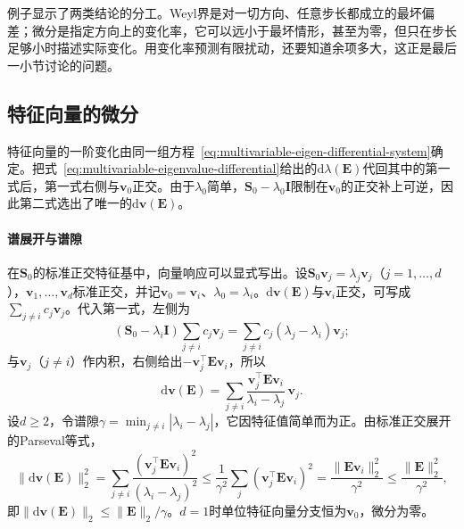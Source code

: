 例子显示了两类结论的分工。Weyl界是对一切方向、任意步长都成立的最坏偏差；微分是指定方向上的变化率，它可以远小于最坏情形，甚至为零，但只在步长足够小时描述实际变化。用变化率预测有限扰动，还要知道余项多大，这正是最后一小节讨论的问题。

\subsection{特征向量的微分}
\label{sec:multivariable-eigenvector-differential}

特征向量的一阶变化由同一组方程~\eqref{eq:multivariable-eigen-differential-system}确定。把式~\eqref{eq:multivariable-eigenvalue-differential}给出的$\mathrm d\lambda(\bm E)$代回其中的第一式后，第一式右侧与$\bm v_0$正交。由于$\lambda_0$简单，$\bm S_0-\lambda_0\bm I$限制在$\bm v_0$的正交补上可逆，因此第二式选出了唯一的$\mathrm d\bm v(\bm E)$。

\paragraph{谱展开与谱隙}
在$\bm S_0$的标准正交特征基中，向量响应可以显式写出。设$\bm S_0\bm v_j=\lambda_j\bm v_j$（$j=1,\ldots,d$），$\bm v_1,\ldots,\bm v_d$标准正交，并记$\bm v_0=\bm v_i$、$\lambda_0=\lambda_i$。$\mathrm d\bm v(\bm E)$与$\bm v_i$正交，可写成$\sum_{j\neq i}c_j\bm v_j$。代入第一式，左侧为
\[
 (\bm S_0-\lambda_i\bm I)\sum_{j\neq i}c_j\bm v_j=\sum_{j\neq i}c_j(\lambda_j-\lambda_i)\bm v_j ;
\]
与$\bm v_j$（$j\neq i$）作内积，右侧给出$-\bm v_j^\top\bm E\bm v_i$，所以
\begin{equation}
 \mathrm d\bm v(\bm E)=\sum_{j\neq i}\frac{\bm v_j^\top\bm E\bm v_i}{\lambda_i-\lambda_j}\,\bm v_j .
\label{eq:multivariable-eigenvector-differential}
\end{equation}
设$d\geq2$，令谱隙$\gamma=\min_{j\neq i}|\lambda_i-\lambda_j|$，它因特征值简单而为正。由标准正交展开的Parseval等式，
\[
 \lVert\mathrm d\bm v(\bm E)\rVert_2^2=\sum_{j\neq i}\frac{(\bm v_j^\top\bm E\bm v_i)^2}{(\lambda_i-\lambda_j)^2}
 \leq\frac1{\gamma^2}\sum_{j}(\bm v_j^\top\bm E\bm v_i)^2=\frac{\lVert\bm E\bm v_i\rVert_2^2}{\gamma^2}\leq\frac{\lVert\bm E\rVert_2^2}{\gamma^2},
\]
即$\lVert\mathrm d\bm v(\bm E)\rVert_2\leq\lVert\bm E\rVert_2/\gamma$。$d=1$时单位特征向量分支恒为$\bm v_0$，微分为零。

